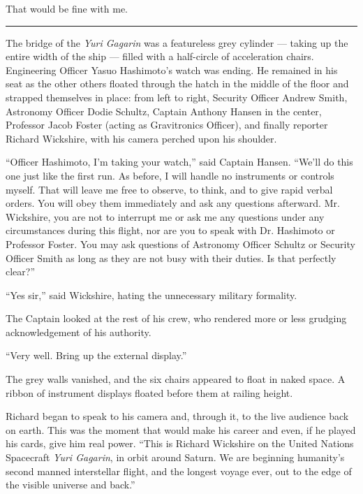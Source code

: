 \documentclass[english,11pt,letterpaper,onecolumn]{scrbook}
\begin{document}
	That would be fine with me.
	
\begin{center}\rule[3pt]{2in}{0.5pt}\end{center}

	The bridge of the \emph{Yuri Gagarin} was a featureless grey cylinder --- taking up the entire width of the ship --- filled with a half-circle of acceleration chairs.  Engineering Officer Yasuo Hashimoto's watch was ending.  He remained in his seat as the other others floated through the hatch in the middle of the floor and strapped themselves in place:  from left to right, Security Officer Andrew Smith, Astronomy Officer Dodie Schultz, Captain Anthony Hansen in the center, Professor Jacob Foster (acting as Gravitronics Officer), and finally reporter Richard Wickshire, with his camera perched upon his shoulder.

	``Officer Hashimoto, I'm taking your watch,'' said Captain Hansen.  ``We'll do this one just like the first run.  As before, I will handle no instruments or controls myself.  That will leave me free to observe, to think, and to give rapid verbal orders.  You will obey them immediately and ask any questions afterward.  Mr. Wickshire, you are not to interrupt me or ask me any questions under any circumstances during this flight, nor are you to speak with Dr. Hashimoto or Professor Foster.  You may ask questions of Astronomy Officer Schultz or Security Officer Smith as long as they are not busy with their duties.  Is that perfectly clear?''

	``Yes sir,'' said Wickshire, hating the unnecessary military formality.

	The Captain looked at the rest of his crew, who rendered more or less grudging acknowledgement of his authority.

	``Very well.  Bring up the external display.''

	The grey walls vanished, and the six chairs appeared to float in naked space.  A ribbon of instrument displays floated before them at railing height.

	Richard began to speak to his camera and, through it, to the live audience back on earth.  This was the moment that would make his career and even, if he played his cards, give him real power.  ``This is Richard Wickshire on the United Nations Spacecraft \emph{Yuri Gagarin}, in orbit around Saturn.  We are beginning humanity's second manned interstellar flight, and the longest voyage ever, out to the edge of the visible universe and back.''
\end{document}
